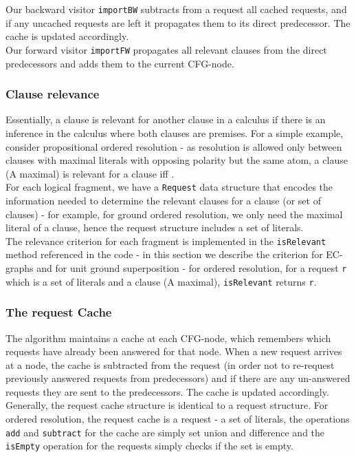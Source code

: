 Our backward visitor \lstinline|importBW| subtracts from a request all cached requests, and if any uncached requests are left it propagates them to its direct predecessor. The cache is updated accordingly.\\
Our forward visitor \lstinline|importFW| propagates all relevant clauses from the direct predecessors and adds them to the current CFG-node.


\subsubsection*{Clause relevance}
Essentially, a clause is relevant for another clause in a calculus if there is an inference in the calculus where both clauses are premises. For a simple example, consider propositional ordered resolution - as resolution is allowed only between clauses with maximal literals with opposing polarity but the same atom, a clause  (A maximal) is relevant for a clause  iff . \\
For each logical fragment, we have a \lstinline|Request| data structure that encodes the information needed to determine the relevant clauses for a clause (or set of clauses) - for example, for ground ordered resolution, we only need the maximal literal of a clause, hence the request structure includes a set of literals.\\
The relevance criterion for each fragment is implemented in the \lstinline|isRelevant| method referenced in the code - in this section we describe the criterion for EC-graphs and for unit ground superposition - for ordered resolution, for a request \lstinline|r| which is a set of literals and a clause  (A maximal),  \lstinline|isRelevant| returns   \lstinline{r}.

\subsubsection*{The request Cache}
The algorithm maintains a cache at each CFG-node, which remembers which requests have already been answered for that node.
When a new request arrives at a node, the cache is subtracted from the request (in order not to re-request previously answered requests from predecessors) and if there are any un-answered requests they are sent to the predecessors. The cache is updated accordingly.
Generally, the request cache structure is identical to a request structure. For ordered resolution, the request cache is a request - a set of literals, the operations \lstinline|add| and \lstinline|subtract| for the cache are simply set union and difference and the \lstinline|isEmpty| operation for the requests simply checks if the set is empty.

